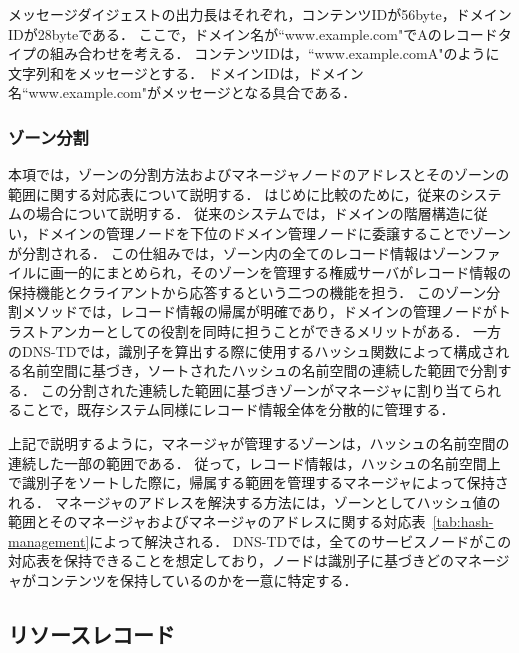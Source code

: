 メッセージダイジェストの出力長はそれぞれ，コンテンツIDが56byte，ドメインIDが28byteである．
ここで，ドメイン名が``www.example.com"でAのレコードタイプの組み合わせを考える．
コンテンツIDは，``www.example.comA"のように文字列和をメッセージとする．
ドメインIDは，ドメイン名``www.example.com"がメッセージとなる具合である．

\subsubsection{ゾーン分割}
本項では，ゾーンの分割方法およびマネージャノードのアドレスとそのゾーンの範囲に関する対応表について説明する．
はじめに比較のために，従来のシステムの場合について説明する．
従来のシステムでは，ドメインの階層構造に従い，ドメインの管理ノードを下位のドメイン管理ノードに委譲することでゾーンが分割される．
この仕組みでは，ゾーン内の全てのレコード情報はゾーンファイルに画一的にまとめられ，そのゾーンを管理する権威サーバがレコード情報の保持機能とクライアントから応答するという二つの機能を担う．
このゾーン分割メソッドでは，レコード情報の帰属が明確であり，ドメインの管理ノードがトラストアンカーとしての役割を同時に担うことができるメリットがある．
一方のDNS-TDでは，識別子を算出する際に使用するハッシュ関数によって構成される名前空間に基づき，ソートされたハッシュの名前空間の連続した範囲で分割する．
この分割された連続した範囲に基づきゾーンがマネージャに割り当てられることで，既存システム同様にレコード情報全体を分散的に管理する．

上記で説明するように，マネージャが管理するゾーンは，ハッシュの名前空間の連続した一部の範囲である．
従って，レコード情報は，ハッシュの名前空間上で識別子をソートした際に，帰属する範囲を管理するマネージャによって保持される．
マネージャのアドレスを解決する方法には，ゾーンとしてハッシュ値の範囲とそのマネージャおよびマネージャのアドレスに関する対応表~\ref{tab:hash-management}によって解決される．
DNS-TDでは，全てのサービスノードがこの対応表を保持できることを想定しており，ノードは識別子に基づきどのマネージャがコンテンツを保持しているのかを一意に特定する．


\newpage
\subsection{リソースレコード}
